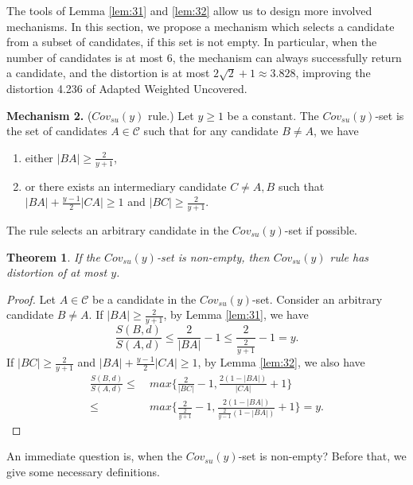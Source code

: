 \documentclass[11pt]{article}
\newtheorem{theorem}{Theorem}[section]
\theoremstyle{remark}
\begin{document}
The tools of Lemma \ref{lem:31} and \ref{lem:32} allow us to design more involved mechanisms. In this section, we propose a mechanism which selects a candidate from a subset of candidates, if this set is not empty. In particular, when the number of candidates is at most 6, the mechanism can always successfully return a candidate, and the distortion is at most $2\sqrt2+1\approx 3.828$, improving the distortion 4.236 of Adapted Weighted Uncovered.

\vspace{2mm}\hspace{-3.5mm}\textbf{Mechanism 2.}  {\sc($Cov_{su}(y)$ rule.)} Let $y\ge 1$ be a constant. The $Cov_{su}(y)$-set is the set of candidates $A\in \mathcal C$ such that for any candidate $B\neq A$, we have
 \begin{enumerate}
\item either $|BA|\ge \frac{2}{y+1}$,
\item or there exists an intermediary candidate $C\ne A,B$ such that $|BA|+\frac{y-1}{2}|CA|\ge 1$ and $|BC|\ge \frac{2}{y+1}$.
 \end{enumerate}
The rule selects an arbitrary candidate in the $Cov_{su}(y)$-set if possible.


\begin{theorem}\label{thm:dis}
 If the $Cov_{su}(y)$-set is non-empty, then $Cov_{su}(y)$ rule has distortion of at most $y$.
 \end{theorem}
\begin{proof}
 Let $A\in \mathcal C$ be a candidate in the $Cov_{su}(y)$-set. Consider an arbitrary candidate $B\neq A$. If $|BA|\ge \frac{2}{y+1}$, by Lemma \ref{lem:31}, we have
$$\frac{S(B,d)}{S(A,d)}\le \frac{2}{|BA|}-1\le \frac{2}{\frac{2}{y+1}} - 1=y.$$
  If $|BC|\ge \frac{2}{y+1}$ and $|BA|+\frac{y-1}{2}|CA|\ge 1$, by Lemma \ref{lem:32}, we also have
  \begin{align*}
 \frac{S(B,d)}{S(A,d)}\le &\ max\{\frac{2}{|BC|}-1 , \frac{2(1-|BA|)}{|CA|} + 1\} \\
 \le& \ max\{\frac{2}{\frac{2}{y+1}}-1 , \frac{2(1-|BA|)}{\frac{2}{y-1}(1-|BA|)} + 1\} = y.
 \end{align*}
 \end{proof}

An immediate question is, when the $Cov_{su}(y)$-set is non-empty? Before that, we give some necessary definitions.
\end{document}
